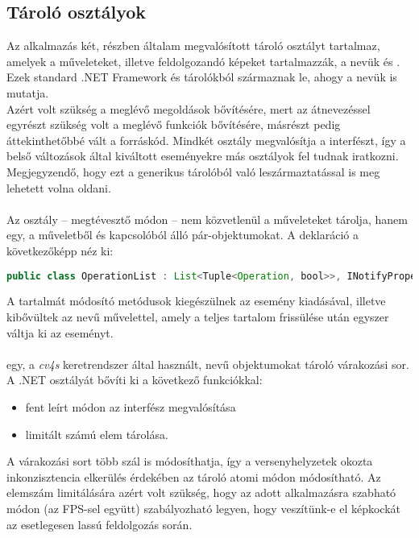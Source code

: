 \subsection{Tároló osztályok}

Az alkalmazás két, részben általam megvalósított tároló osztályt tartalmaz, amelyek a műveleteket, illetve feldolgozandó képeket tartalmazzák, a nevük  és . Ezek standard .NET Framework  és  tárolókból származnak le, ahogy a nevük is mutatja.\\
Azért volt szükség a meglévő megoldások bővítésére, mert az átnevezéssel egyrészt szükség volt a meglévő funkciók bővítésére, másrészt pedig áttekinthetőbbé vált a forráskód. Mindkét osztály megvalósítja a   interfészt, így a belső változások által kiváltott eseményekre más osztályok fel tudnak iratkozni. Megjegyzendő, hogy ezt a  generikus tárolóból való leszármaztatással is meg lehetett volna oldani.

\paragraph{}
Az osztály -- megtévesztő módon -- nem közvetlenül a műveleteket tárolja, hanem egy, a műveletből és  kapcsolóból álló pár-objektumokat. A deklaráció a következőképp néz ki:
\begin{scriptsize}
\begin{lstlisting}[language=java]
public class OperationList : List<Tuple<Operation, bool>>, INotifyPropertyChanged
\end{lstlisting}
\end{scriptsize}

A  tartalmát módosító metódusok kiegészülnek az esemény kiadásával, illetve kibővültek az  nevű művelettel, amely a teljes tartalom frissülése után egyszer váltja ki az eseményt.

\paragraph{} egy, a \emph{cv4s} keretrendszer által használt,  nevű objektumokat tároló várakozási sor. A .NET  osztályát bővíti ki a következő funkciókkal:
\begin{itemize}
\item fent leírt módon az  interfész megvalósítása
\item limitált számú elem tárolása.
\end{itemize}
A várakozási sort több szál is módosíthatja, így a versenyhelyzetek okozta inkonzisztencia elkerülés érdekében az tároló atomi módon módosítható. Az elemszám limitálására azért volt szükség, hogy az adott alkalmazásra szabható módon (az FPS-sel együtt) szabályozható legyen, hogy veszítünk-e el képkockát az esetlegesen lassú feldolgozás során.

